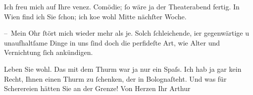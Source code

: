 \pstart
           Ich freu mich auf Ihre venez.
                  Comödie;{ }ſo wäre ja der Theaterabend fertig. In Wien find ich Sie{ }ſchon; ich ko{\geminationm}e wohl Mitte
               nächſter Woche.\pend
           
\pstart
           – Mein Ohr{ }ſtört mich wieder mehr als je. Solch{ }ſchleichende, {\pb}i{\geminationm}er gegenwärtige u unaufhaltſame Dinge in uns{ }ſind doch
               die perfideſte Art, wie Alter und Vernichtung{ }ſich ankündigen.\pend
           
\pstart
           Leben Sie wohl. Das mit dem Thurm war ja nur
               ein Spaſs. Ich hab ja gar kein Recht, Ihnen einen Thurm zu{ }ſchenken, der in Bolognaſteht. Und was für Scherereien hätten Sie an der
               Grenze!\pend
           \pstart Von Herzen Ihr \spacefill\mbox{Arthur}\pend{}\endnumbering{}  \newcommand{\dateiname}{L00850}\newcommand{\titel}{Arthur Schnitzler an Hugo von Hofmannsthal, 4. 10. 1898}\newcommand{\editorInnen}{Martin Anton Müller und Gerd-Hermann Susen}
